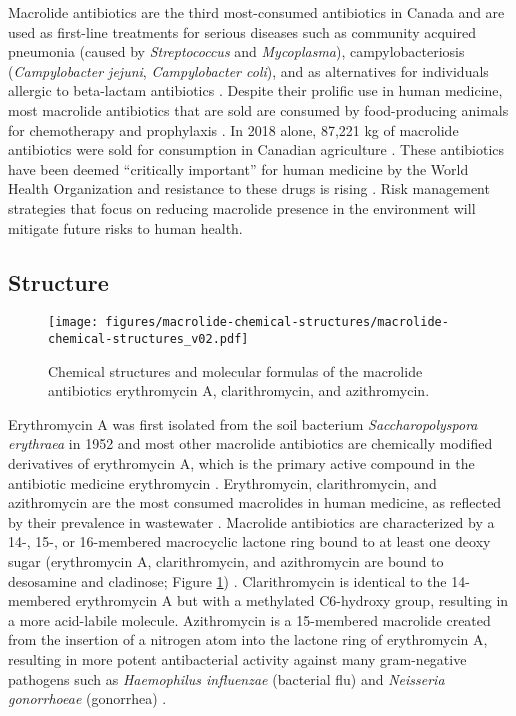 Macrolide antibiotics are the third most-consumed antibiotics in Canada and are used as first-line treatments for serious diseases such as community acquired pneumonia (caused by \textit{Streptococcus} and \textit{Mycoplasma}), campylobacteriosis (\textit{Campylobacter jejuni}, \textit{Campylobacter coli}), and as alternatives for individuals allergic to beta-lactam antibiotics \parencite{PublicHealthAgencyofCanada.2020, Lohsen.2019}.
Despite their prolific use in human medicine, most macrolide antibiotics that are sold are consumed by food-producing animals for chemotherapy and prophylaxis \parencite{Lohsen.2019}.
In 2018 alone, 87,221 kg of macrolide antibiotics were sold for consumption in Canadian agriculture \parencite{PublicHealthAgencyofCanada.2020}.
These antibiotics have been deemed “critically important” for human medicine by the World Health Organization and resistance to these drugs is rising \parencite{WHO.2017, PublicHealthAgencyofCanada.2020}.
Risk management strategies that focus on reducing macrolide presence in the environment will mitigate future risks to human health.

\subsection{Structure}

\begin{figure}[htb]
	\centering
		\texttt{[image: figures/macrolide-chemical-structures/macrolide-chemical-structures\_v02.pdf]}
	\caption[Chemical structures and molecular formulas of the macrolide antibiotics erythromycin A, clarithromycin, and azithromycin.]{
	Chemical structures and molecular formulas of the macrolide antibiotics erythromycin A, clarithromycin, and azithromycin.
	}
	\label{fig:macrolide-chemical-structures}
\end{figure}

Erythromycin A was first isolated from the soil bacterium \textit{Saccharopolyspora erythraea} in 1952 and most other macrolide antibiotics are chemically modified derivatives of erythromycin A, which is the primary active compound in the antibiotic medicine erythromycin \parencite{Haight.1952}.
Erythromycin, clarithromycin, and azithromycin are the most consumed macrolides in human medicine, as reflected by their prevalence in wastewater \parencite{Miao.2004, RodriguezMozaz.2020}.
Macrolide antibiotics are characterized by a 14-, 15-, or 16-membered macrocyclic lactone ring bound to at least one deoxy sugar (erythromycin A, clarithromycin, and azithromycin are bound to desosamine and cladinose; Figure \ref{fig:macrolide-chemical-structures}) \parencite{Lohsen.2019}.
Clarithromycin is identical to the 14-membered erythromycin A but with a methylated C6-hydroxy group, resulting in a more acid-labile molecule.
Azithromycin is a 15-membered macrolide created from the insertion of a nitrogen atom into the lactone ring of erythromycin A, resulting in more potent antibacterial activity against many gram-negative pathogens such as \textit{Haemophilus influenzae} (bacterial flu) and \textit{Neisseria gonorrhoeae} (gonorrhea) \parencite{Yanagihara.2009}.

